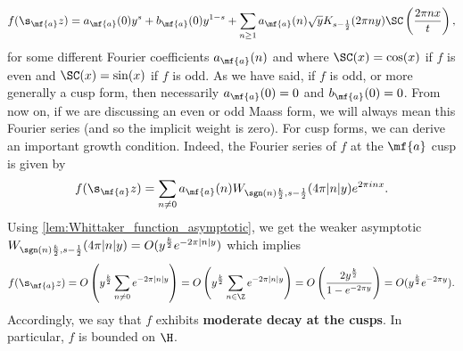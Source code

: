     \[
      f(\s_{\mf{a}}z) = a_{\mf{a}}(0)y^{s}+b_{\mf{a}}(0)y^{1-s}+\sum_{n \ge 1}a_{\mf{a}}(n)\sqrt{y}K_{s-\frac{1}{2}}(2\pi ny)\SC\left(\frac{2\pi nx}{t}\right),
    \]
    for some different Fourier coefficients $a_{\mf{a}}(n)$ and where $\SC(x) = \cos(x)$ if $f$ is even and $\SC(x) = \sin(x)$ if $f$ is odd. As we have said, if $f$ is odd, or more generally a cusp form, then necessarily $a_{\mf{a}}(0) = 0$ and $b_{\mf{a}}(0) = 0$. From now on, if we are discussing an even or odd Maass form, we will always mean this Fourier series (and so the implicit weight is zero). For cusp forms, we can derive an important growth condition. Indeed, the Fourier series of $f$ at the $\mf{a}$ cusp is given by
    \[
      f(\s_{\mf{a}}z) = \sum_{n \neq 0}a_{\mf{a}}(n)W_{\sgn(n)\frac{k}{2},s-\frac{1}{2}}(4\pi|n|y)e^{2\pi inx}.
    \]
    Using \cref{lem:Whittaker_function_asymptotic}, we get the weaker asymptotic $W_{\sgn(n)\frac{k}{2},s-\frac{1}{2}}(4\pi|n|y) = O(y^{\frac{k}{2}}e^{-2\pi|n|y})$ which implies
    \[
      f(\s_{\mf{a}}z) = O\left(y^{\frac{k}{2}}\sum_{n \neq 0}e^{-2\pi|n|y}\right) = O\left(y^{\frac{k}{2}}\sum_{n \in \Z}e^{-2\pi|n|y}\right) = O\left(\frac{2y^{\frac{k}{2}}}{1-e^{-2\pi y}}\right) = O(y^{\frac{k}{2}}e^{-2\pi y}).
    \]
    Accordingly, we say that $f$ exhibits \textbf{moderate decay at the cusps}. In particular, $f$ is bounded on $\H$.
